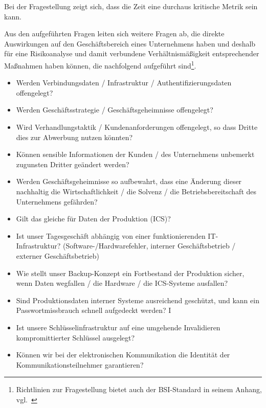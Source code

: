 \noindent
Bei der Fragestellung zeigt sich, dass die Zeit eine durchaus kritische Metrik sein kann.

\noindent
Aus den aufgeführten Fragen leiten sich weitere Fragen ab, die direkte Auswirkungen auf den Geschäftsbereich eines Unternehmens haben und deshalb für eine Risikoanalyse und damit verbundene Verhältnismäßigkeit entsprechender Maßnahmen haben können, die nachfolgend aufgeführt sind\footnote{
Richtlinien zur Fragestellung bietet auch der BSI-Standard in seinem Anhang, vgl.~\cite[173 ff.]{BSI200-2}
}.

\begin{itemize}
    \itemsep0.5em
    \item  Werden Verbindungsdaten / Infrastruktur / Authentifizierungsdaten offengelegt?
    \item  Werden Geschäftsstrategie / Geschäftsgeheimnisse offengelegt?
    \item  Wird Verhandlungstaktik / Kundenanforderungen offengelegt, so dass Dritte dies zur Abwerbung nutzen könnten?
    \item  Können sensible Informationen der Kunden / des Unternehmens unbemerkt zugunsten Dritter geändert werden?
    \item  Werden Geschäftsgeheimnisse so aufbewahrt, dass eine Änderung dieser nachhaltig die Wirtschaftlichkeit / die Solvenz / die Betriebsbereitschaft des Unternehmens gefährden?
    \item  Gilt das gleiche für Daten der Produktion (ICS)?
    \item  Ist unser Tagesgeschäft abhängig von einer funktionierenden IT-Infrastruktur? (Software-/Hardwarefehler, interner Geschäftsbetrieb / externer Geschäftsbetrieb)
    \item  Wie stellt unser Backup-Konzept ein Fortbestand der Produktion sicher, wenn Daten wegfallen / die Hardware / die ICS-Systeme ausfallen?
    \item  Sind Produktionsdaten interner Systeme ausreichend geschützt, und kann ein Passwortmissbrauch schnell aufgedeckt werden?
I   \item  Ist unsere Schlüsselinfrastruktur auf eine umgehende Invalidieren kompromittierter Schlüssel ausgelegt?
    \item  Können wir bei der elektronischen Kommunikation die Identität der Kommunikationsteilnehmer garantieren?
\end{itemize}
